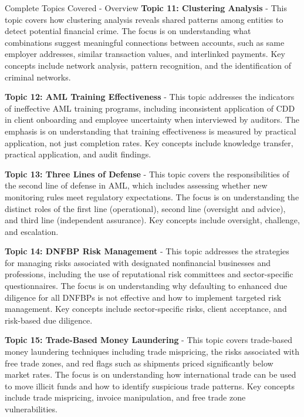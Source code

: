 \documentclass[8pt]{beamer}  %
\begin{document}
\begin{frame}{Complete Topics Covered - Overview}
		\vspace{0.2cm}
		\textbf{Topic 11: Clustering Analysis} - This topic covers how clustering analysis reveals shared patterns among entities to detect potential financial crime. The focus is on understanding what combinations suggest meaningful connections between accounts, such as same employer addresses, similar transaction values, and interlinked payments. Key concepts include network analysis, pattern recognition, and the identification of criminal networks.
		
		\vspace{0.2cm}
		\textbf{Topic 12: AML Training Effectiveness} - This topic addresses the indicators of ineffective AML training programs, including inconsistent application of CDD in client onboarding and employee uncertainty when interviewed by auditors. The emphasis is on understanding that training effectiveness is measured by practical application, not just completion rates. Key concepts include knowledge transfer, practical application, and audit findings.
		
		\vspace{0.2cm}
		\textbf{Topic 13: Three Lines of Defense} - This topic covers the responsibilities of the second line of defense in AML, which includes assessing whether new monitoring rules meet regulatory expectations. The focus is on understanding the distinct roles of the first line (operational), second line (oversight and advice), and third line (independent assurance). Key concepts include oversight, challenge, and escalation.
		
		\vspace{0.2cm}
		\textbf{Topic 14: DNFBP Risk Management} - This topic addresses the strategies for managing risks associated with designated nonfinancial businesses and professions, including the use of reputational risk committees and sector-specific questionnaires. The focus is on understanding why defaulting to enhanced due diligence for all DNFBPs is not effective and how to implement targeted risk management. Key concepts include sector-specific risks, client acceptance, and risk-based due diligence.
		
		\vspace{0.2cm}
		\textbf{Topic 15: Trade-Based Money Laundering} - This topic covers trade-based money laundering techniques including trade mispricing, the risks associated with free trade zones, and red flags such as shipments priced significantly below market rates. The focus is on understanding how international trade can be used to move illicit funds and how to identify suspicious trade patterns. Key concepts include trade mispricing, invoice manipulation, and free trade zone vulnerabilities.
	\end{frame}
	
\end{document}

